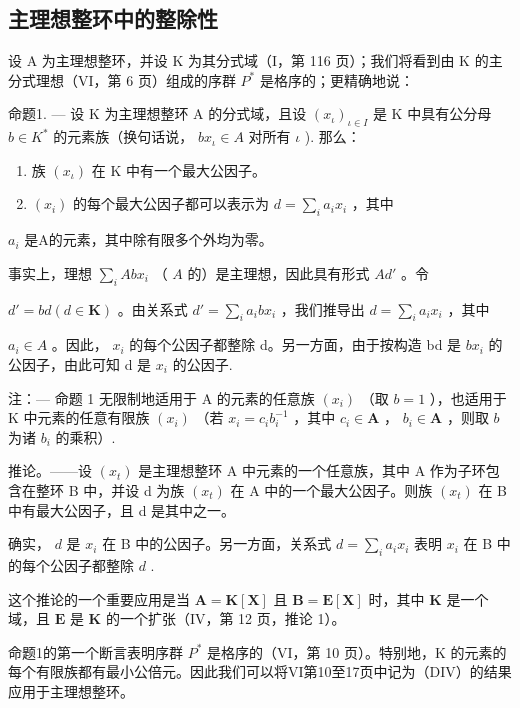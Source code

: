 \subsection{主理想整环中的整除性}

设 A 为主理想整环，并设 K 为其分式域（I，第 116 页）；我们将看到由 K 的主分式理想（VI，第 6 页）组成的序群 \(P^{*}\) 是格序的；更精确地说：

命题1. --- 设 K 为主理想整环 A 的分式域，且设 \((x_{\iota})_{\iota \in I}\) 是 K 中具有公分母 \(b \in K^{*}\) 的元素族（换句话说， \(bx_{\iota} \in A\) 对所有 \(\iota\) ). 那么：

\begin{enumerate}
\def\labelenumi{\alph{enumi})}
\item
  族 \((x_{\iota})\) 在 K 中有一个最大公因子。
\item
  \((x_{i})\) 的每个最大公因子都可以表示为 \(d = \sum_{i}a_{i}x_{i}\) ，其中
\end{enumerate}

\(a_{i}\) 是A的元素，其中除有限多个外均为零。

事实上，理想 \(\sum_{i} A b x_{i}\) （ \(A\) 的）是主理想，因此具有形式 \(A d'\) 。令

\(d' = bd (d \in \mathbf{K})\) 。由关系式 \(d' = \sum_{i} a_i b x_i\) ，我们推导出 \(d = \sum_{i} a_i x_i\) ，其中

\(a_{i} \in A\) 。因此， \(x_{i}\) 的每个公因子都整除 d。另一方面，由于按构造 bd 是 \(bx_{i}\) 的公因子，由此可知 d 是 \(x_{i}\) 的公因子.

注：--- 命题 1 无限制地适用于 A 的元素的任意族 \((x_{i})\) （取 \(b = 1\) ），也适用于 K 中元素的任意有限族 \((x_{i})\) （若 \(x_{i} = c_{i}b_{i}^{-1}\) ，其中 \(c_{i} \in \mathbf{A}\) ， \(b_{i} \in \mathbf{A}\) ，则取 \(b\) 为诸 \(b_{i}\) 的乘积）.

推论。——设 \((x_{t})\) 是主理想整环 A 中元素的一个任意族，其中 A 作为子环包含在整环 B 中，并设 d 为族 \((x_{t})\) 在 A 中的一个最大公因子。则族 \((x_{t})\) 在 B 中有最大公因子，且 d 是其中之一。

确实， \(d\) 是 \(x_{i}\) 在 B 中的公因子。另一方面，关系式 \(d = \sum_{i} a_{i} x_{i}\) 表明 \(x_{i}\) 在 B 中的每个公因子都整除 \(d\) .

这个推论的一个重要应用是当 \(\mathbf{A} = \mathbf{K}[\mathbf{X}]\) 且 \(\mathbf{B} = \mathbf{E}[\mathbf{X}]\) 时，其中 \(\mathbf{K}\) 是一个域，且 \(\mathbf{E}\) 是 \(\mathbf{K}\) 的一个扩张（IV，第 12 页，推论 1）。

命题1的第一个断言表明序群 \(P^{*}\) 是格序的（VI，第 10 页）。特别地，K 的元素的每个有限族都有最小公倍元。因此我们可以将VI第10至17页中记为（DIV）的结果应用于主理想整环。

